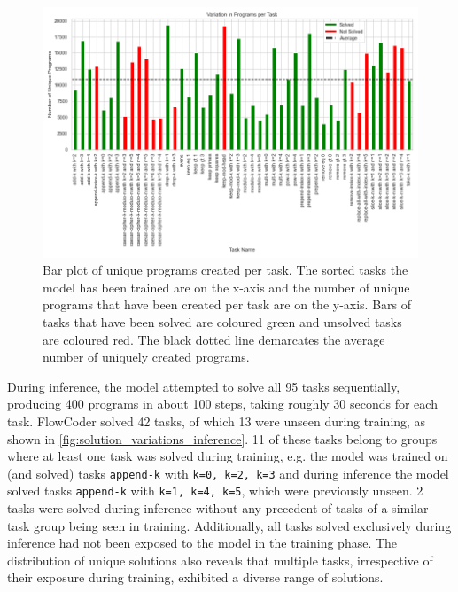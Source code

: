 \begin{figure}[H]
    \centering
    \includegraphics[width=\textwidth]{../img/plot_program_variations_binary_depth_3_48_tasks2023-12-07 22:24:45.png}
    \caption{Bar plot of unique programs created per task. The sorted tasks the model has been trained are on the x-axis and the number of unique programs that have been created per task are on the y-axis. Bars of tasks that have been solved are coloured green and unsolved tasks are coloured red. The black dotted line demarcates the average number of uniquely created programs.}
    \label{fig:program_variations_binary_train}
\end{figure}

During inference, the model attempted to solve all 95 tasks sequentially, producing 400 programs in about 100 steps, taking roughly 30 seconds for each task. FlowCoder solved 42 tasks, of which 13 were unseen during training, as shown in \autoref{fig:solution_variations_inference}. 11 of these tasks belong to groups where at least one task was solved during training, e.g. the model was trained on (and solved) tasks \texttt{append-k} with \texttt{k=0, k=2, k=3} and during inference the model solved tasks \texttt{append-k} with \texttt{k=1, k=4, k=5}, which were previously unseen. 2 tasks were solved during inference without any precedent of tasks of a similar task group being seen in training. Additionally, all tasks solved exclusively during inference had not been exposed to the model in the training phase.
The distribution of unique solutions also reveals that multiple tasks, irrespective of their exposure during training, exhibited a diverse range of solutions. 

